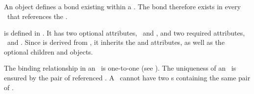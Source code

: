 \clearpage


\subsection{}
\label{def:InSpeciesTypeBond}

An  object defines a bond existing within a \speciesType. The bond therefore exists in every \species\ that references the \speciesType. 

 is defined in . It has two optional attributes, \idAtt\ and \nameAtt, and two required attributes, \bindingSiteOneAtt\ and \bindingSiteTwoAtt. Since  is derived from , it inherits the  and  attributes, as well as the optional children  and  objects. 

\label{def:InSpeciesTypeBondNote}
The binding relationship in an \inSpeciesTypeBond\ is one-to-one (see ). The uniqueness of an \inSpeciesTypeBond\ is ensured by the pair of referenced . A \speciesType\ cannot have two \inSpeciesTypeBond s containing the same pair of . 

